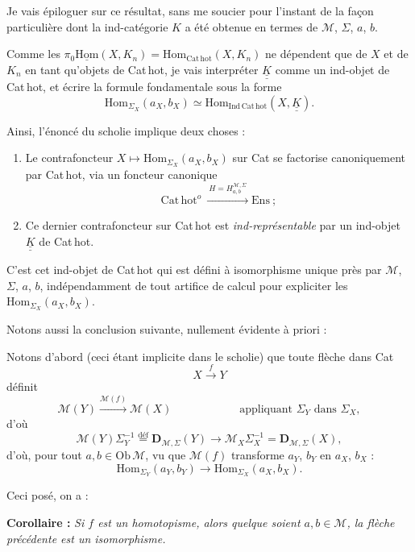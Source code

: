 \documentclass[11pt]{article}
\newcommand{\printedpage}[1]{\marginpar{\footnotesize p.~#1}}
\newcommand{\msp}[1]{\marginpar{\footnotesize [#1]}}
\newcommand{\uHom}{\underline{\mathrm{Hom}}}
\newcommand{\cM}{\mathcal{M}}
\newcommand{\KK}{\underline{\underline{K}}}
\newcommand{\dfeq}{\overset{\text{déf}}{=}}
\newcommand{\Cathot}{\mathrm{Cat\,hot}}
\begin{document}
\printedpage{21}

\msp{page 34}
Je vais épiloguer sur ce résultat, sans me soucier pour l'instant de la façon particulière dont la ind-catégorie $K$ a été obtenue en termes de $\cM$, $\Sigma$, $a$, $b$.

Comme les $\pi_0\uHom(X,K_n)=\mathrm{Hom}_{\Cathot}(X,K_n)$ ne dépendent que de $X$ et de $K_n$ en tant qu'objets de Cat\,hot, je vais interpréter $\KK$ comme un ind-objet de Cat\,hot, et écrire la formule fondamentale sous la forme
\[
\mathrm{Hom}_{\Sigma_X}(a_X,b_X)\simeq\mathrm{Hom}_{\mathrm{Ind\,Cat\,hot}}(X,\KK).
\]

Ainsi, l'énoncé du scholie implique deux choses :

\begin{enumerate}
\item[a)] Le contrafoncteur $X\longmapsto\mathrm{Hom}_{\Sigma_X}(a_X,b_X)$ sur Cat se factorise canoniquement par Cat\,hot, via un foncteur canonique
\[
\Cathot^{o}\ \xrightarrow{\ H=H^{\cM,\Sigma}_{a,b}\ }\mathrm{Ens}\ ;
\]
\item[b)] Ce dernier contrafoncteur sur Cat\,hot est \textit{ind-représentable} par un ind-objet $\KK$ de Cat\,hot.
\end{enumerate}

C'est cet ind-objet de Cat\,hot qui est défini à isomorphisme unique près par $\cM$, $\Sigma$, $a$, $b$, indépendamment de tout artifice de calcul pour expliciter les $\mathrm{Hom}_{\Sigma_X}(a_X,b_X)$.

Notons aussi la conclusion suivante, nullement évidente à priori :

\msp{page 35}
Notons d'abord (ceci étant implicite dans le scholie) que toute flèche dans Cat
\[
X\xrightarrow{\ f\ }Y
\]
définit
\[
\cM(Y)\xrightarrow{\cM(f)}\cM(X) \qquad\qquad\qquad \text{appliquant } \Sigma_Y \text{ dans } \Sigma_X,
\]
d'où
\[
\cM(Y)\Sigma_Y^{-1}\dfeq\mathbf{D}_{\cM,\Sigma}(Y)\longrightarrow\cM_X\Sigma_X^{-1}=\mathbf{D}_{\cM,\Sigma}(X),
\]
 d'où, pour tout $a,b\in\mathrm{Ob}\,\cM$, vu que $\cM(f)$ transforme $a_Y$, $b_Y$ en $a_X$, $b_X$ :
\[
\boxed{\mathrm{Hom}_{\Sigma_Y}(a_Y,b_Y)\longrightarrow\mathrm{Hom}_{\Sigma_X}(a_X,b_X).}
\]

Ceci posé, on a :

\textbf{Corollaire :} \textit{Si $f$ est un homotopisme, alors quelque soient $a,b\in\cM$, la flèche précédente est un isomorphisme.} %
\end{document}
